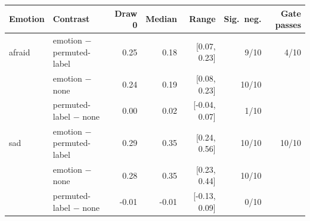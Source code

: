 \begin{tabular}{llrrrrr}
\toprule
Emotion & Contrast & Draw 0 & Median & Range & Sig.\ neg. & Gate passes \\
\midrule
afraid & emotion $-$ permuted-label & 0.25 & 0.18 & [0.07, 0.23] & 9/10 & 4/10 \\
 & emotion $-$ none & 0.24 & 0.19 & [0.08, 0.23] & 10/10 &  \\
 & permuted-label $-$ none & 0.00 & 0.02 & [-0.04, 0.07] & 1/10 &  \\
sad & emotion $-$ permuted-label & 0.29 & 0.35 & [0.24, 0.56] & 10/10 & 10/10 \\
 & emotion $-$ none & 0.28 & 0.35 & [0.23, 0.44] & 10/10 &  \\
 & permuted-label $-$ none & -0.01 & -0.01 & [-0.13, 0.09] & 0/10 &  \\
\bottomrule
\end{tabular}
